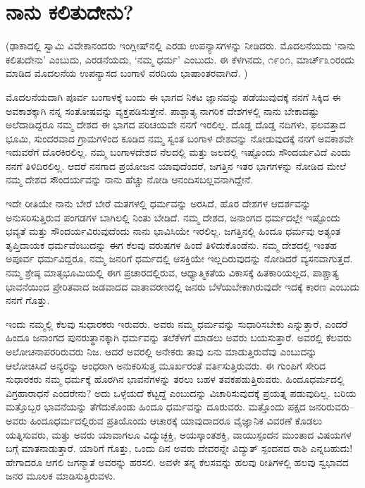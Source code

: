 
\chapter{ನಾನು ಕಲಿತುದೇನು?}

(ಢಾಕಾದಲ್ಲಿ ಸ್ವಾಮಿ ವಿವೇಕಾನಂದರು ಇಂಗ್ಲೀಷ್​ನಲ್ಲಿ ಎರಡು ಉಪನ್ಯಾಸಗಳನ್ನು ನೀಡಿದರು. ಮೊದಲನೆಯದು ‘ನಾನು ಕಲಿತುದೇನು’ ಎಂಬುದು, ಎರಡನೆಯದು, ‘ನಮ್ಮ ಧರ್ಮ’ ಎಂಬುದು. ಈ ಕೆಳಗಿನದು, ೧೯೦೧, ಮಾರ್ಚ್​ ೩೦ರಂದು ಮಾಡಿದ ಮೊದಲನೆಯ ಉಪನ್ಯಾಸದ ಬಂಗಾಳಿ ವರದಿಯ ಭಾಷಾಂತರವಾಗಿದೆ. )

ಮೊದಲನೆಯದಾಗಿ ಪೂರ್ವ ಬಂಗಾಳಕ್ಕೆ ಬಂದು ಈ ಭಾಗದ ನಿಕಟ ಜ್ಞಾನವನ್ನು ಪಡೆಯುವುದಕ್ಕೆ ನನಗೆ ಸಿಕ್ಕಿದ ಈ ಅವಕಾಶಕ್ಕಾಗಿ ನನ್ನ ಸಂತೋಷವನ್ನು ವ್ಯಕ್ತಪಡಿಸುತ್ತೇನೆ. ಪಾಶ್ಚಾತ್ಯ ನಾಗರಿಕ ದೇಶಗಳಲ್ಲಿ ನಾನು ಬೇಕಾದಷ್ಟು ಅಲೆದಾಡಿದ್ದರೂ ನಮ್ಮ ದೇಶದ ಈ ಭಾಗದ ಪರಿಚಯವೇ ನನಗೆ ಇರಲಿಲ್ಲ. ದೊಡ್ಡ ದೊಡ್ಡ ನದಿಗಳು, ಫಲವತ್ತಾದ ಭೂಮಿ, ಸುಂದರವಾದ ಗ್ರಾಮಗಳಿಂದ ಕೂಡಿದ ನಮ್ಮ ಸ್ವಂತ ಬಂಗಾಳ ದೇಶವನ್ನು ನೋಡುವುದಕ್ಕೆ ನನಗೆ ಅವಕಾಶವೇ ಇದುವರೆಗೆ ದೊರಕಿರಲಿಲ್ಲ. ನಮ್ಮ ಬಂಗಾಳದೇಶದ ನೆಲದಲ್ಲಿ ಮತ್ತು ಜಲದಲ್ಲಿ ಇಷ್ಟೊಂದು ಸೌಂದರ್ಯವಿದೆ ಎಂದು ನನಗೆ ತಿಳಿದಿರಲಿಲ್ಲ. ಆದರೆ ನನಗಾದ ಪ್ರಯೋಜನ ಯಾವುದೆಂದರೆ, ಜಗತ್ತಿನ ಇತರ ಭಾಗಗಳನ್ನು ನೋಡಿದ ಮೇಲೆ ನಮ್ಮ ದೇಶದ ಸೌಂದರ್ಯವನ್ನು ನಾನು ಹೆಚ್ಚು ನೋಡಿ ಆನಂದಿಸಬಲ್ಲವನಾಗಿದ್ದೇನೆ. 

ಇದೇ ರೀತಿಯೇ ನಾನು ಬೇರೆ ಬೇರೆ ಮತಗಳಲ್ಲಿ ಧರ್ಮವನ್ನು ಅರಸಿದೆ, ಹೊರ ದೇಶಗಳ ಆದರ್ಶವನ್ನು ಅನುಸರಿಸುತ್ತಿರುವ ಪಂಗಡಗಳ ಬಾಗಿಲಲ್ಲಿ ನಿಂತು ಬೇಡಿದೆ. ನಮ್ಮ ದೇಶದ, ಜನಾಂಗದ ಧರ್ಮದಲ್ಲೇ ಇಷ್ಟೊಂದು ಭವ್ಯತೆ ಮತ್ತು ಸೌಂದರ್ಯವಿರುವುದೆಂದು ನಾನು ಭಾವಿಸಿಯೇ ಇರಲಿಲ್ಲ. ಜಗತ್ತಿನಲ್ಲಿ ಹಿಂದೂ ಧರ್ಮವು ಅತ್ಯಂತ ತೃಪ್ತಿದಾಯಕ ಧರ್ಮವೆಂಬುದನ್ನು ಈಗ ಕೆಲವು ವರುಷಗಳ ಹಿಂದೆ ತಿಳಿದುಕೊಂಡೆನು. ನಮ್ಮ ದೇಶದಲ್ಲಿ ಇಂತಹ ಅಪೂರ್ವ ಧರ್ಮವಿದ್ದರೂ, ನಮ್ಮ ಜನರಿಗೆ ಧರ್ಮದಲ್ಲಿ ಆಸಕ್ತಿಯೇ ಇಲ್ಲದಿರುವುದನ್ನು ನೋಡಿದರೆ ವ್ಯಸನವಾಗುತ್ತದೆ. ನಮ್ಮ ಶ್ರೇಷ್ಠ ಮಾತೃಭೂಮಿಯಲ್ಲಿ ಈಗ ಪ್ರಚಾರದಲ್ಲಿರುವ, ಆಧ್ಯಾತ್ಮಿಕತೆಯ ವಿಕಾಸಕ್ಕೆ ಹಿತಕಾರಿಯಲ್ಲದ, ಪಾಶ್ಚಾತ್ಯ ಭಾವನೆಯಿಂದ ಪ್ರೇರಿತವಾದ ಜಡವಾದದ ವಾತಾವರಣದಲ್ಲಿ ಜನರು ಬೆಳೆಯಬೇಕಾಗಿರುವುದೇ ಇದಕ್ಕೆ ಕಾರಣ ಎಂಬುದು ನನಗೆ ಗೊತ್ತು. 

ಇಂದು ನಮ್ಮಲ್ಲಿ ಕೆಲವು ಸುಧಾರಕರು ಇರುವರು. ಅವರು ನಮ್ಮ ಧರ್ಮವನ್ನು ಸುಧಾರಿಸಬೇಕು ಎನ್ನುತ್ತಾರೆ, ಎಂದರೆ ಹಿಂದೂ ಜನಾಂಗದ ಪುನರುತ್ಥಾನಕ್ಕಾಗಿ ಧರ್ಮವನ್ನು ತಲೆಕೆಳಗೆ ಮಾಡಲು ಅವರು ಬಯಸುತ್ತಾರೆ. ಅವರಲ್ಲಿ ಕೆಲವರು ಅಲೋಚನಾಪರರಿರುವರು ನಿಜ. ಆದರೆ ಅವರಲ್ಲಿ ಅನೇಕರು ತಾವು ಏನು ಮಾಡುತ್ತಿರುವೆವು ಎಂಬುದನ್ನು ಆಲೋಚಿಸಿದೆ ಅನ್ಯರನ್ನು ಅಂಧರಾಗಿ ಅನುಕರಿಸುತ್ತ ಮೂರ್ಖರಂತೆ ವರ್ತಿಸುತ್ತಿರುವರು. ಈ ಗುಂಪಿಗೆ ಸೇರಿದ ಸುಧಾರಕರು ನಮ್ಮ ಧರ್ಮಕ್ಕೆ ಹೊರಗಿನ ಭಾವನೆಗಳನ್ನು ತರಲು ಬಹಳ ತವಕಪಡುತ್ತಿರುವರು. ಹಿಂದೂಧರ್ಮದಲ್ಲಿ ವಿಗ್ರಹಾರಾಧನೆ ಎಂದರೇನು? ಅದು ಒಳ್ಳೆಯದೆ ಕೆಟ್ಟದ್ದೆ ಎಂಬುದನ್ನು ವಿಚಾರಿಸುವುದಕ್ಕೆ ಪ್ರಯತ್ನ ಪಡುವುದಿಲ್ಲ. ಬರಿಯ ಮತ್ತೊಬ್ಬರ ಭಾವನೆಯನ್ನು ತೆಗೆದುಕೊಂಡು ಹಿಂದೂ ಧರ್ಮವನ್ನು ದೂರುವರು. ಮತ್ತೊಂದು ಪಕ್ಷದ ಜನರಿರುವರು–ಅವರು ಹಿಂದೂಧರ್ಮದಲ್ಲಿರುವ ಪ್ರತಿಯೊಂದು ಆಚಾರಕ್ಕೆ ಯಾವುದಾದರೂ ವೈಜ್ಞಾನಿಕ ವಿವರಣೆ ಕೊಡಲು ಯತ್ನಿಸುವರು, ಮತ್ತು ಅವರು ಯಾವಾಗಲೂ ವಿದ್ಯುಚ್ಛಕ್ತಿ, ಅಯಸ್ಕಾಂತಶಕ್ತಿ, ವಾಯುಸ್ಪಂದನ ಮುಂತಾದ ವಿಷಯಗಳ ಬಗ್ಗೆ ಮಾತನಾಡುತ್ತಾರೆ. ಯಾರಿಗೆ ಗೊತ್ತು, ಒಂದು ದಿನ ಅವರು ದೇವರನ್ನೇ ವಿದ್ಯುತ್​ ಸ್ಪಂದನದ ರಾಶಿ ಎನ್ನಬಹುದು! ಹೇಗಾದರೂ ಆಗಲಿ ಜಗನ್ಮಾತೆ ಅವರನ್ನು ಹರಸಲಿ. ಅವಳೇ ತನ್ನ ಕೆಲಸವನ್ನು ಹಲವು ರೀತಿಗಳಲ್ಲಿ ಹಲವು ಸ್ವಭಾವದ ಜನರ ಮೂಲಕ ಮಾಡಿಸುತ್ತಿರುವಳು. 

